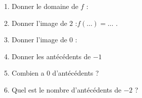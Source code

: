 \documentclass[main.tex]{subfiles}
\begin{document}
\begin{exercise}
{\begin{tikzpicture}[xscale=1.05, yscale=1.05]
			
		\end{tikzpicture}
	}\hfill 
	\parbox{0.48\linewidth}{
		\begin{enumerate}[label=\arabic*),leftmargin=*]
			\item Donner  le domaine de $f$ : \dotfill
			\item Donner l'image de $2$ :\dotfill $f(\ldots)=\ldots$ .
			\item Donner l'image de $0$ : \dotfill 
			\item Donner les antécédents de $-1$\dotfill
			\item Combien a $0$ d'antécédents ?\dotfill
			\item Quel est le nombre d'antécédents de $-2$ ?\dotfill
		\end{enumerate}
		
		
		
		\noindent{}  
	} 
\end{exercise} 

%	
%		
%		
%		 
\end{document}
